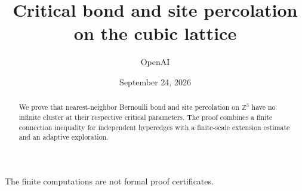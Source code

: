 \documentclass[11pt]{article}
\title{Critical bond and site percolation on the cubic lattice}
\author{OpenAI}
\date{September 24, 2026}
\theoremstyle{definition}
\theoremstyle{remark}
\numberwithin{equation}{section}
\begin{document}
\maketitle
\begin{abstract}
We prove that nearest-neighbor Bernoulli bond and site percolation on
$\mathbb Z^3$ have no infinite cluster at their respective critical parameters.
The proof combines a finite connection inequality for independent hyperedges
with a finite-scale extension estimate and an adaptive exploration.
\end{abstract}






The finite computations are not formal proof certificates.


\end{document}
